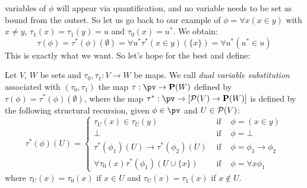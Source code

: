 variables of $\phi$ will appear via quantification, and no variable
needs to be set as bound from the outset. So let us go back to our example of
$\phi=\forall x(x\in y)$ with $x\neq y$, $\tau_{1}(x)=\tau_{1}(y)=u$
and $\tau_{0}(x)=u^{*}$. We obtain:
    \[
    \tau(\phi)=\tau^{*}(\phi)(\emptyset)=\forall u^{*}\tau^{*}(x\in
    y)(\{x\})=\forall u^{*}(u^{*}\in u)
    \]
This is exactly what we want. So let's hope for the best and define:
\begin{defin}\label{logic:def:FOPL:dualsubst:dualsubst}
Let $V$, $W$ be sets and $\tau_{0}, \tau_{1}:V\to W$ be maps. We
call {\em dual variable substitution} associated with
$(\tau_{0},\tau_{1})$ the map $\tau:\pv\to {\bf P}(W)$ defined by
$\tau(\phi)=\tau^{*}(\phi)(\emptyset)$, where the map $\tau^{*}:\pv\to[{\cal
P}(V)\to{\bf P}(W)]$ is defined by the following structural
recursion, given $\phi\in\pv$ and $U\in{\cal P}(V)$:
    \begin{equation}\label{logic:eqn:FOPL:dualsubst:dualsubst:1}
                    \tau^{*}(\phi)(U)=\left\{
                    \begin{array}{lcl}
                    \tau_{U}(x)\in\tau_{U}(y)&\mbox{\ if\ }&\phi=(x\in y)\\
                    \bot&\mbox{\ if\ }&\phi=\bot\\
                    \tau^{*}(\phi_{1})(U)\to\tau^{*}(\phi_{2})(U)
                    &\mbox{\ if\ }&\phi=\phi_{1}\to\phi_{2}\\
                    \forall\tau_{0}(x)\tau^{*}(\phi_{1})(U\cup\{x\})&
                    \mbox{\ if\ }&\phi=\forall x\phi_{1}
                    \end{array}\right.
    \end{equation}
where $\tau_{U}(x)=\tau_{0}(x)$ if $x\in U$ and
$\tau_{U}(x)=\tau_{1}(x)$ if $x\not\in U$.
\end{defin}

